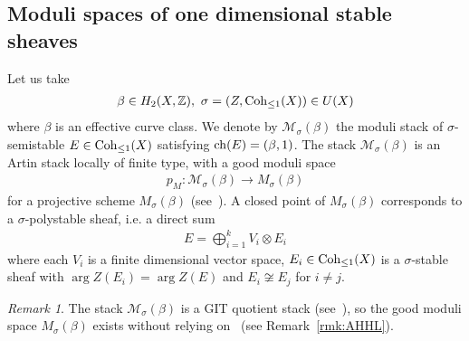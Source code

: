 \documentclass[11pt]{amsart}
\theoremstyle{plain}
\theoremstyle{definition}
\theoremstyle{remark}
\newtheorem{rmk}[thm]{Remark}
\newcommand{\mM}{\mathcal{M}}
\newcommand{\ch}{\mathop{\rm ch}\nolimits}
\newcommand{\Coh}{\mathop{\rm Coh}\nolimits}
\begin{document}
\subsection{Moduli spaces of one dimensional stable sheaves}
Let 
us take
\begin{align*}
\beta \in H_2(X, \mathbb{Z}), \ 
\sigma=(Z, \Coh_{\le 1}(X)) \in U(X)
\end{align*}
where $\beta$ is an effective curve class. 
We denote by $\mM_{\sigma}(\beta)$
the moduli stack of $\sigma$-semistable 
$E \in \Coh_{\le 1}(X)$ 
satisfying $\ch(E)=(\beta, 1)$. 
The stack $\mM_{\sigma}(\beta)$ is an Artin 
stack locally of finite type, with a 
good moduli space
\begin{align*}
p_M \colon 
\mM_{\sigma}(\beta) \to M_{\sigma}(\beta)
\end{align*}
for a projective scheme $M_{\sigma}(\beta)$ (see~\cite[Lemma~7.4]{Todstack}). 
A closed point of $M_{\sigma}(\beta)$ corresponds to a 
$\sigma$-polystable sheaf, i.e. a direct sum
\begin{align}\label{polystable}
E=\bigoplus_{i=1}^k V_i \otimes E_i
\end{align}
where each $V_i$ is a finite dimensional 
vector space, $E_i \in \Coh_{\le 1}(X)$ is a $\sigma$-stable sheaf
with $\arg Z(E_i)=\arg Z(E)$ and 
$E_i \not\cong E_j$ for $i\neq j$.
\begin{rmk}
The stack $\mM_{\sigma}(\beta)$ is a GIT quotient stack
(see~\cite[Lemma~7.4]{Todstack}), 
so the good moduli space $M_{\sigma}(\beta)$
exists without relying on~\cite{AHLH}
(see Remark~\ref{rmk:AHHL}). 
\end{rmk}
\end{document}
